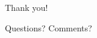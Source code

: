 \documentclass[
	11pt, %
	aspectratio=169, %
]{beamer}
\begin{document}

\begin{frame}[plain] %
	\begin{center}
		{\Huge Thank you!}
		
		\bigskip\bigskip %
		
		{\LARGE Questions? Comments?}
	\end{center}
\end{frame}





\end{document}
